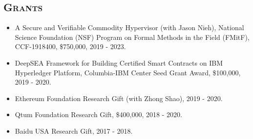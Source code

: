 \documentclass[10pt]{article}
\renewcommand{\section}[1]{
	\vspace{-5pt}
   	\subsection*{\scshape  \bfseries #1}
   }
\newenvironment{innerlist}[1][\enskip\textbullet]%
        {\begin{itemize}[#1,leftmargin=25pt,parsep=0pt,itemsep=2pt,topsep=2pt,partopsep=0pt]}
        {\end{itemize}}
\begin{document}
\section{Grants}
\begin{innerlist}

\item[] A Secure and Verifiable Commodity Hypervisor (with Jason Nieh), 
National Science Foundation (NSF) Program on Formal Methods in the                                   
Field (FMitF), CCF-1918400, \$750,000,  2019 - 2023.

\vspace{0.1in}

\item[] DeepSEA Framework for Building Certified Smart Contracts on IBM Hyperledger Platform, 
Columbia-IBM Center Seed Grant Award, \$100,000,  2019 - 2020.

\vspace{0.1in}



\item[] {Ethereum Foundation Research Gift} (with Zhong Shao), 2019 - 2020.
\vspace{0.1in}

\item[] {Qtum Foundation Research Gift}, \$400,000, 2018 - 2020.
\vspace{0.1in}

\item[] {Baidu USA Research Gift}, 2017 - 2018.
\end{innerlist}
\end{document}
